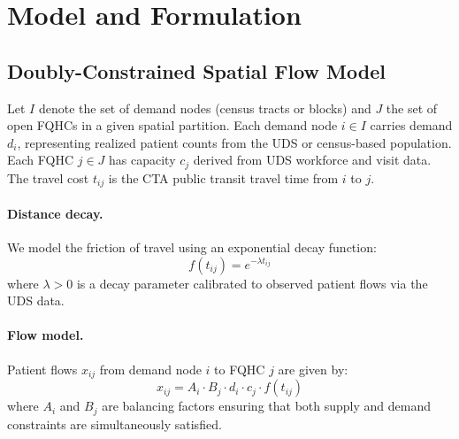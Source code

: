 \documentclass[11pt]{article}
\begin{document}
\section{Model and Formulation}\label{sec:model}

\subsection{Doubly-Constrained Spatial Flow Model}\label{sec:flow-model}

Let $I$ denote the set of demand nodes (census tracts or blocks) and $J$ the set of open FQHCs
in a given spatial partition. Each demand node $i \in I$ carries demand $d_i$, representing
realized patient counts from the UDS or census-based population. Each FQHC $j \in J$ has
capacity $c_j$ derived from UDS workforce and visit data. The travel cost $t_{ij}$ is the
CTA public transit travel time from $i$ to $j$.

\paragraph{Distance decay.}
We model the friction of travel using an exponential decay function:
\begin{equation}
    f(t_{ij}) = e^{-\lambda t_{ij}}
    \label{eq:decay}
\end{equation}
where $\lambda > 0$ is a decay parameter calibrated to observed patient flows via the UDS data.

\paragraph{Flow model.}
Patient flows $x_{ij}$ from demand node $i$ to FQHC $j$ are given by:
\begin{equation}
    x_{ij} = A_i \cdot B_j \cdot d_i \cdot c_j \cdot f(t_{ij})
    \label{eq:flow}
\end{equation}
where $A_i$ and $B_j$ are balancing factors ensuring that both supply and demand constraints
are simultaneously satisfied.
\end{document}

